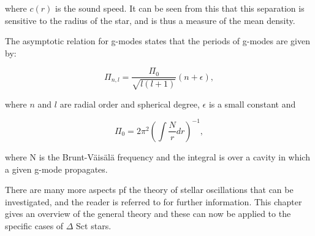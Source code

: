 \noindent where $c(r)$ is the sound speed. It can be seen from this that this separation is sensitive to the radius of the star, and is thus a measure of the mean density. 

The asymptotic relation for g-modes states that the periods of g-modes are given by: 

\begin{equation}
    \Pi_{n,l} = \frac{\Pi_0}{\sqrt{l(l+1)}}(n+\epsilon),
\end{equation}

\noindent where $n$ and $l$ are radial order and spherical degree, $\epsilon$ is a small constant and 

\begin{equation}
    \Pi_{0} = 2\pi^2\left(\int \frac{N}{r} dr\right)^{-1},
\end{equation}

\noindent where N is the Brunt-Väisälä frequency and the integral is over a cavity in which a given g-mode propagates.

There are many more aspects pf the theory of stellar oscillations that can be investigated, and the reader is referred to \citet{aerts2010} for further information. This chapter gives an overview of the general theory and these can now be applied to the specific cases of $\Delta$ Sct stars. 

